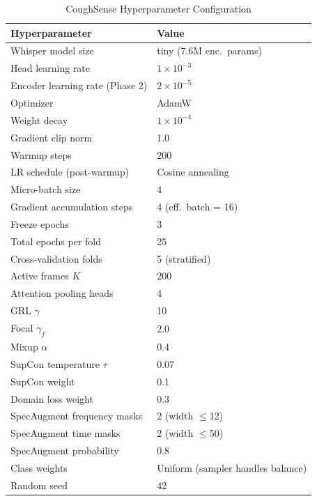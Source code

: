 \documentclass[10pt,journal,compsoc]{IEEEtran}
\begin{document}
\begin{table}[!t]
\caption{CoughSense Hyperparameter Configuration}
\label{tab:hparams}
\centering
\setlength{\tabcolsep}{5pt}
\begin{tabular}{ll}
\toprule
\textbf{Hyperparameter}        & \textbf{Value} \\
\midrule
Whisper model size             & tiny (7.6M enc.\ params) \\
Head learning rate             & $1\times10^{-3}$ \\
Encoder learning rate (Phase 2)& $2\times10^{-5}$ \\
Optimizer                      & AdamW \\
Weight decay                   & $1\times10^{-4}$ \\
Gradient clip norm             & 1.0 \\
Warmup steps                   & 200 \\
LR schedule (post-warmup)      & Cosine annealing \\
Micro-batch size               & 4 \\
Gradient accumulation steps    & 4 (eff.\ batch = 16) \\
Freeze epochs                  & 3 \\
Total epochs per fold          & 25 \\
Cross-validation folds         & 5 (stratified) \\
Active frames $K$              & 200 \\
Attention pooling heads        & 4 \\
GRL $\gamma$                   & 10 \\
Focal $\gamma_f$               & 2.0 \\
Mixup $\alpha$                 & 0.4 \\
SupCon temperature $\tau$      & 0.07 \\
SupCon weight                  & 0.1 \\
Domain loss weight             & 0.3 \\
SpecAugment frequency masks    & 2 (width $\leq$12) \\
SpecAugment time masks         & 2 (width $\leq$50) \\
SpecAugment probability        & 0.8 \\
Class weights                  & Uniform (sampler handles balance) \\
Random seed                    & 42 \\
\bottomrule
\end{tabular}
\end{table}
\end{document}
